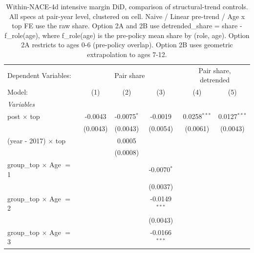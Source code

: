 
\begin{table}[htbp]
   \caption{\label{tab:phase4_within_intensive_did_prepolicy_baseline} Within-NACE-4d intensive margin DiD, comparison of structural-trend controls. All specs at pair-year level, clustered on cell. Naive / Linear pre-trend / Age x top FE use the raw share. Option 2A and 2B use detrended\_share = share - f\_role(age), where f\_role(age) is the pre-policy mean share by (role, age). Option 2A restricts to ages 0-6 (pre-policy overlap). Option 2B uses geometric extrapolation to ages 7-12.}
   \centering
   \begin{tabular}{lccccc}
      \tabularnewline \midrule \midrule
      Dependent Variables: & \multicolumn{3}{c}{Pair share} & \multicolumn{2}{c}{Pair share, detrended}\\
      Model:                           & (1)                   & (2)                   & (3)             & (4)            & (5)\\  
      \midrule
      \emph{Variables}\\
      post $\times$ top                & -0.0043               & -0.0075$^{*}$         & -0.0019         & 0.0258$^{***}$ & 0.0127$^{***}$\\   
                                       & (0.0043)              & (0.0043)              & (0.0054)        & (0.0061)       & (0.0043)\\   
      (year - 2017) $\times$ top       &                       & 0.0005                &                 &                &   \\   
                                       &                       & (0.0008)              &                 &                &   \\   
      group\_top $\times$ Age $=$ 1    &                       &                       & -0.0070$^{*}$   &                &   \\   
                                       &                       &                       & (0.0037)        &                &   \\   
      group\_top $\times$ Age $=$ 2    &                       &                       & -0.0149$^{***}$ &                &   \\   
                                       &                       &                       & (0.0043)        &                &   \\   
      group\_top $\times$ Age $=$ 3    &                       &                       & -0.0166$^{***}$ &                &   \\   

\end{tabular}
\end{table}
